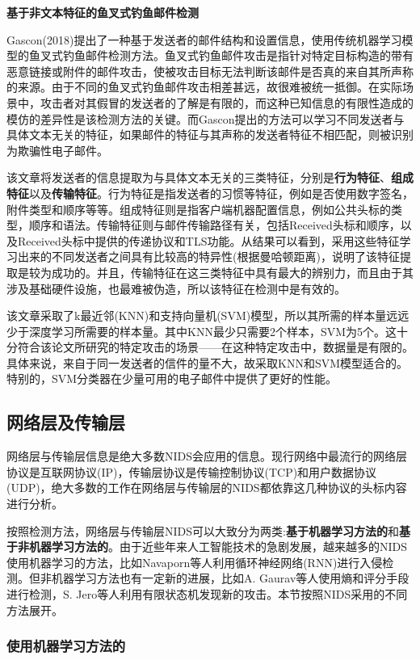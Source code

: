 \documentclass[12pt]{article} %
\begin{document}
\textbf{基于非文本特征的鱼叉式钓鱼邮件检测}

Gascon(2018)\cite{Gascon}提出了一种基于发送者的邮件结构和设置信息，使用传统机器学习模型的鱼叉式钓鱼邮件检测方法。鱼叉式钓鱼邮件攻击是指针对特定目标构造的带有恶意链接或附件的邮件攻击，使被攻击目标无法判断该邮件是否真的来自其所声称的来源。由于不同的鱼叉式钓鱼邮件攻击相差甚远，故很难被统一抵御。在实际场景中，攻击者对其假冒的发送者的了解是有限的，而这种已知信息的有限性造成的模仿的差异性是该检测方法的关键。而Gascon提出的方法可以学习不同发送者与具体文本无关的特征，如果邮件的特征与其声称的发送者特征不相匹配，则被识别为欺骗性电子邮件。

该文章将发送者的信息提取为与具体文本无关的三类特征，分别是\textbf{行为特征}、\textbf{组成特征}以及\textbf{传输特征}。行为特征是指发送者的习惯等特征，例如是否使用数字签名，附件类型和顺序等等。组成特征则是指客户端机器配置信息，例如公共头标的类型，顺序和语法。传输特征则与邮件传输路径有关，包括Received头标和顺序，以及Received头标中提供的传递协议和TLS功能。从结果可以看到，采用这些特征学习出来的不同发送者之间具有比较高的特异性(根据曼哈顿距离)，说明了该特征提取是较为成功的。并且，传输特征在这三类特征中具有最大的辨别力，而且由于其涉及基础硬件设施，也最难被伪造，所以该特征在检测中是有效的。

该文章采取了k最近邻(KNN)和支持向量机(SVM)模型，所以其所需的样本量远远少于深度学习所需要的样本量。其中KNN最少只需要2个样本，SVM为5个。这十分符合该论文所研究的特定攻击的场景——在这种特定攻击中，数据量是有限的。具体来说，来自于同一发送者的信件的量不大，故采取KNN和SVM模型适合的。特别的，SVM分类器在少量可用的电子邮件中提供了更好的性能。

\subsection{网络层及传输层}
\label{ip}

网络层与传输层信息是绝大多数NIDS会应用的信息。现行网络中最流行的网络层协议是互联网协议(IP)，传输层协议是传输控制协议(TCP)和用户数据协议(UDP)，绝大多数的工作在网络层与传输层的NIDS都依靠这几种协议的头标内容进行分析。

按照检测方法，网络层与传输层NIDS可以大致分为两类:\textbf{基于机器学习方法的}和\textbf{基于非机器学习方法的}。由于近些年来人工智能技术的急剧发展，越来越多的NIDS使用机器学习的方法，比如Navaporn等人利用循环神经网络(RNN)进行入侵检测。但非机器学习方法也有一定新的进展，比如A. Gaurav等人使用熵和评分手段进行检测，S. Jero等人利用有限状态机发现新的攻击。本节按照NIDS采用的不同方法展开。

\subsubsection{使用机器学习方法的}
\label{ml}
\end{document}
